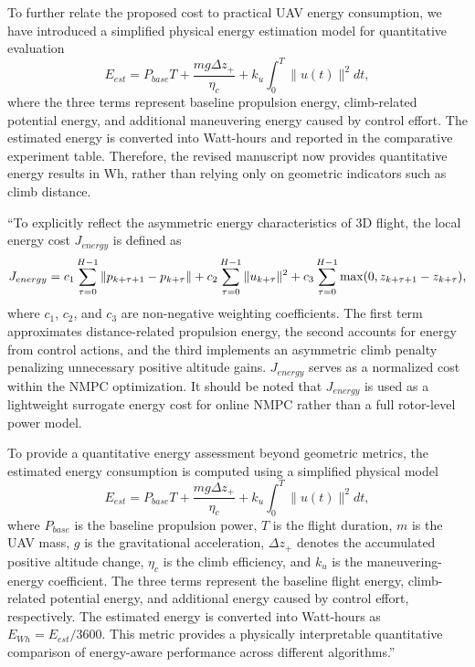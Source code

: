 \documentclass[12pt, twosides]{article}
\theoremstyle{definition}
\begin{document}
To further relate the proposed cost to practical UAV energy consumption, we have introduced a simplified physical energy estimation model for quantitative evaluation
\[
E_{est} = P_{base} T + \frac{m g \Delta z_+}{\eta_c} + k_u \int_0^T \| u(t) \|^2 dt,
\]
where the three terms represent baseline propulsion energy, climb-related potential energy, and additional maneuvering energy caused by control effort. The estimated energy is converted into Watt-hours and reported in the comparative experiment table. Therefore, the revised manuscript now provides quantitative energy results in Wh, rather than relying only on geometric indicators such as climb distance.

``To explicitly reflect the asymmetric energy characteristics of 3D flight, the local energy cost $J_{energy}$ is defined as
\[
\small
J_{energy}
= c_1 \sum_{\tau=0}^{H-1} \| {p}_{k+\tau+1} - {p}_{k+\tau} \|
+ c_2 \sum_{\tau=0}^{H-1} \| {u}_{k+\tau} \|^2
+ c_3 \sum_{\tau=0}^{H-1} \max(0, z_{k+\tau+1} - z_{k+\tau}),
\]
where $c_1$, $c_2$, and $c_3$ are non-negative weighting coefficients. The first term approximates distance-related propulsion energy, the second accounts for energy from control actions, and the third implements an asymmetric climb penalty penalizing unnecessary positive altitude gains. $J_{energy}$ serves as a normalized cost within the NMPC optimization. It should be noted that $J_{energy}$ is used as a lightweight surrogate energy cost for online NMPC rather than a full rotor-level power model.

To provide a quantitative energy assessment beyond geometric metrics, the estimated energy consumption is computed using a simplified physical model
\[
E_{est} = P_{base} T + \frac{m g \Delta z_+}{\eta_c} + k_u \int_0^T \| u(t) \|^2 dt,
\]
where $P_{base}$ is the baseline propulsion power, $T$ is the flight duration, $m$ is the UAV mass, $g$ is the gravitational acceleration, $\Delta z_+$ denotes the accumulated positive altitude change, $\eta_c$ is the climb efficiency, and $k_u$ is the maneuvering-energy coefficient. The three terms represent the baseline flight energy, climb-related potential energy, and additional energy caused by control effort, respectively. The estimated energy is converted into Watt-hours as $E_{Wh}=E_{est}/3600$. This metric provides a physically interpretable quantitative comparison of energy-aware performance across different algorithms.''
\end{document}
